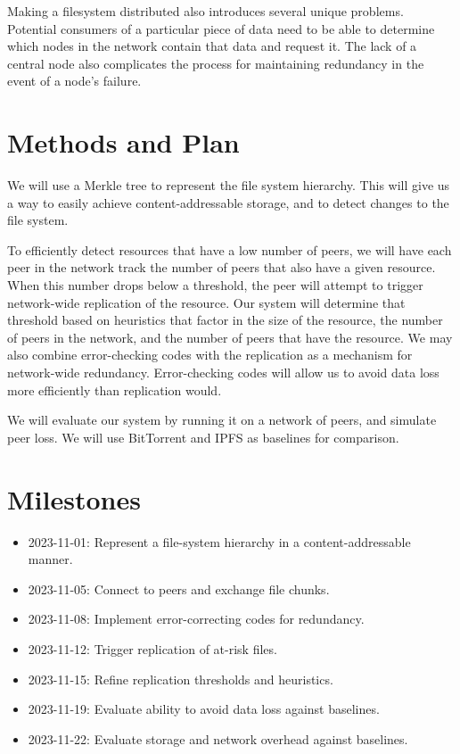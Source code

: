 \documentclass[twocolumn]{article}
\begin{document}
Making a filesystem distributed also introduces several unique problems.
Potential consumers of a particular piece of data need to be able to determine which nodes in the network contain that data and request it.
The lack of a central node also complicates the process for maintaining redundancy in the event of a node's failure.

\section{Methods and Plan}


We will use a Merkle tree to represent the file system hierarchy.
This will give us a way to easily achieve content-addressable storage, and to detect changes to the file system.

To efficiently detect resources that have a low number of peers, we will have each peer in the network track the number of peers that also have a given resource.
When this number drops below a threshold, the peer will attempt to trigger network-wide replication of the resource.
Our system will determine that threshold based on heuristics that factor in the size of the resource, the number of peers in the network, and the number of peers that have the resource.
We may also combine error-checking codes with the replication as a mechanism for network-wide redundancy.
Error-checking codes will allow us to avoid data loss more efficiently than replication would.

We will evaluate our system by running it on a network of peers, and simulate peer loss.
We will use BitTorrent and IPFS as baselines for comparison.

\section{Milestones}


\begin{itemize}
	\item 2023-11-01: Represent a file-system hierarchy in a content-addressable manner.
	\item 2023-11-05: Connect to peers and exchange file chunks.
	\item 2023-11-08: Implement error-correcting codes for redundancy.
	\item 2023-11-12: Trigger replication of at-risk files.
	\item 2023-11-15: Refine replication thresholds and heuristics.
	\item 2023-11-19: Evaluate ability to avoid data loss against baselines.
	\item 2023-11-22: Evaluate storage and network overhead against baselines.
\end{itemize}
\end{document}
